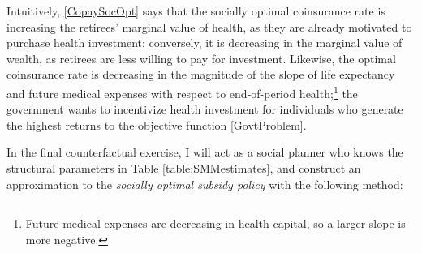 \documentclass[12pt,pdftex,letterpaper]{article}
\begin{document}
Intuitively, \eqref{CopaySocOpt} says that the socially optimal coinsurance rate is increasing the retirees' marginal value of health, as they are already motivated to purchase health investment; conversely, it is decreasing in the marginal value of wealth, as retirees are less willing to pay for investment.  Likewise, the optimal coinsurance rate is decreasing in the magnitude of the slope of life expectancy and future medical expenses with respect to end-of-period health;\footnote{Future medical expenses are decreasing in health capital, so a larger slope is more negative.} the government wants to incentivize health investment for individuals who generate the highest returns to the objective function \eqref{GovtProblem}.

In the final counterfactual exercise, I will act as a social planner who knows the structural parameters in Table \ref{table:SMMestimates}, and construct an approximation to the \textit{socially optimal subsidy policy} with the following method:
\end{document}
